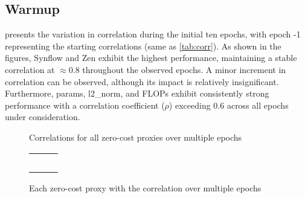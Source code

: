 \subsection{Warmup}

 presents the variation in correlation during the initial ten epochs, with epoch -1 representing the starting correlations (same as \cref{tab:corr}). As shown in the figures, \gls{Synflow} and Zen exhibit the highest performance, maintaining a stable correlation at $\approx 0.8$ throughout the observed epochs. A minor increment in correlation can be observed, although its impact is relatively insignificant. Furthermore, params, l2\_norm, and \gls{FLOPs} exhibit consistently strong performance with a correlation coefficient ($\rho$) exceeding $0.6$ across all epochs under consideration.

\begin{figure}[!ht]
  \centering
  
  \caption{Correlations for all zero-cost proxies over multiple epochs}
  \label{fig:warmup}
\end{figure}

\clearpage

\begin{figure}[htbp]
  \centering
    \begin{adjustbox}{width=1.2\columnwidth,center}
  \begin{tabular}{ccc}
     &
     &
     \\
     &
     &
     \\
     &
     &
     \\
     &
     &
     \\
     &
     
  \end{tabular}
  \end{adjustbox}
  \caption{Each zero-cost proxy with the correlation over multiple epochs}
  \label{fig:warmup_seperate}
\end{figure}
